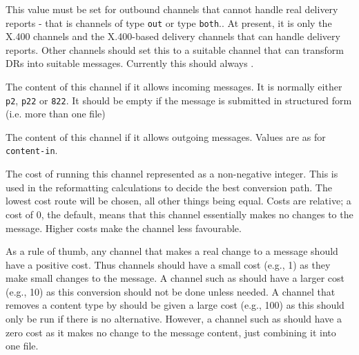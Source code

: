 \begin{describe}
\item[\verb+drchan=value+:]
This value must be set for outbound channels that cannot handle real
delivery reports - that is channels of type \verb|out| or type
\verb|both|.. At present, it is only the X.400 channels and the
X.400-based delivery channels that can handle delivery reports.  Other
channels should set this to a suitable channel that can transform DRs
into suitable messages. Currently this should always
.


\item[\verb+content-in=value+:]
The content of this channel if it allows incoming messages. It is
normally either \verb+p2+, \verb+p22+ or \verb+822+. It should be
empty if the message is submitted in structured form (i.e. more than
one file)

\item[\verb+content-out=value+:]
The content of this channel if it allows outgoing messages. Values are
as for \verb|content-in|.

\item[\verb+cost=value+:]
The cost of running this channel represented as a non-negative
integer. This is used in the reformatting calculations to decide the
best conversion path.  The lowest cost route will be chosen, all other
things being equal. Costs are relative; a cost of 0, the default,
means that this channel essentially makes no changes to the message.
Higher costs make the channel less favourable. 

As a rule of thumb, any channel that makes a real change to a message
should have a positive cost. Thus  channels should
have a small cost (e.g., 1) as they make small changes to the message.
A channel such as  should have a larger cost (e.g., 10)
as this conversion should not be done unless needed. A channel that
removes a content type by  should be given a large cost
(e.g., 100) as this should only be run if there is no alternative.
However, a channel such as  should have a zero cost as
it makes no change to the message content, just combining it into one
file.


\end{describe}
